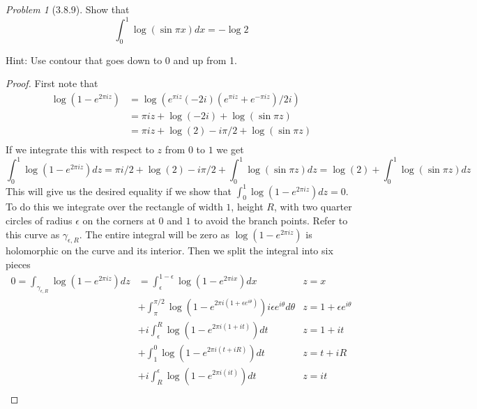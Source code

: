 \documentclass[10pt]{article}
\newcommand{\sk}{\vskip 10mm}
\theoremstyle{remark}
\newtheorem{problem}{Problem}
\theoremstyle{remark}
\begin{document}
\sk

\begin{problem}[3.8.9]
  Show that
  \[
    \int_0^1\log\left(\sin\pi x\right)dx = -\log 2
  \]

  Hint: Use contour that goes down to 0 and up from 1.
\end{problem}

\begin{proof}
  First note that
  \begin{align*}
    \log\left(1-e^{2\pi iz}\right) &=\log\left(e^{\pi iz}\left(-2i\right)\left(e^{\pi iz}+e^{-\pi iz}\right)/2i\right)\\
                      &=\pi iz + \log\left(-2i\right)+\log\left(\sin\pi z\right)\\
                      &= \pi iz + \log\left(2\right)-i\pi/2+\log\left(\sin\pi z\right)\\
  \end{align*}
  If we integrate this with respect to $z$ from $0$ to $1$ we get
  \[
    \int_0^1\log\left(1-e^{2\pi iz}\right)dz=\pi i/2+\log\left(2\right)-i\pi/2+\int_0^1\log\left(\sin\pi z\right) dz = \log\left(2\right)+\int_0^1\log\left(\sin\pi z\right) dz
  \]
  This will give us the desired equality if we show that $\int_0^1\log\left(1-e^{2\pi iz}\right)dz=0$. To do this
  we integrate over the rectangle of width $1$, height $R$, with two quarter circles of radius $\epsilon$
  on the corners at $0$ and $1$ to avoid the branch points. Refer to this curve as $\gamma_{\epsilon,R}$. The
  entire integral will be zero as $\log\left(1-e^{2\pi iz}\right)$ is holomorphic on the curve and its interior.
  Then we split the integral into six pieces
  \begin{align*}
    0 = \int_{\gamma_{\epsilon,R}}\log\left(1-e^{2\pi iz}\right)dz &= \int_\epsilon^{1-\epsilon}\log\left(1-e^{2\pi ix}\right) dx & z=x\\
                                                     &+ \int_{\pi}^{\pi/2}\log\left(1-e^{2\pi i\left(1+\epsilon e^{i\theta}\right)}\right)i\epsilon e^{i\theta}d\theta & z=1+\epsilon e^{i\theta}\\
                                                     &+ i\int_\epsilon^R\log\left(1-e^{2\pi i\left(1+it\right)}\right)dt & z=1+it\\
                                                     &+ \int_1^0\log\left(1-e^{2\pi i\left(t+iR\right)}\right)dt & z=t+iR\\
                                                     &+ i\int_R^\epsilon\log\left(1-e^{2\pi i\left(it\right)}\right) dt & z=it\\

\end{align*}
\end{proof}
\end{document}
